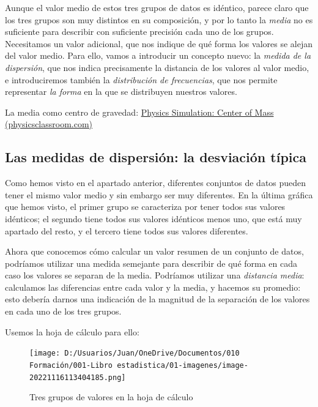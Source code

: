 \documentclass[
  letterpaper,
  DIV=11,
  numbers=noendperiod,
  oneside]{scrreprt}
\begin{document}
Aunque el valor medio de estos tres grupos de datos es idéntico, parece
claro que los tres grupos son muy distintos en su composición, y por lo
tanto la \emph{media} no es suficiente para describir con suficiente
precisión cada uno de los grupos. Necesitamos un valor adicional, que
nos indique de qué forma los valores se alejan del valor medio. Para
ello, vamos a introducir un concepto nuevo: la \emph{medida de la
dispersión}, que nos indica precisamente la distancia de los valores al
valor medio, e introduciremos también la \emph{distribución de
frecuencias}, que nos permite representar \emph{la forma} en la que se
distribuyen nuestros valores.

La media como centro de gravedad:
\href{https://www.physicsclassroom.com/Physics-Interactives/Balance-and-Rotation/COM-Builder/Center-Of-Mass-Interactive}{Physics
Simulation: Center of Mass (physicsclassroom.com)}

\hypertarget{las-medidas-de-dispersiuxf3n-la-desviaciuxf3n-tuxedpica}{%
\subsection{Las medidas de dispersión: la desviación
típica}\label{las-medidas-de-dispersiuxf3n-la-desviaciuxf3n-tuxedpica}}

Como hemos visto en el apartado anterior, diferentes conjuntos de datos
pueden tener el mismo valor medio y sin embargo ser muy diferentes. En
la última gráfica que hemos visto, el primer grupo se caracteriza por
tener todos sus valores idénticos; el segundo tiene todos sus valores
idénticos menos uno, que está muy apartado del resto, y el tercero tiene
todos sus valores diferentes.

Ahora que conocemos cómo calcular un valor resumen de un conjunto de
datos, podríamos utilizar una medida semejante para describir de qué
forma en cada caso los valores se separan de la media. Podríamos
utilizar una \emph{distancia media}: calculamos las diferencias entre
cada valor y la media, y hacemos su promedio: esto debería darnos una
indicación de la magnitud de la separación de los valores en cada uno de
los tres grupos.

Usemos la hoja de cálculo para ello:

\begin{figure}

{\centering \texttt{[image: D:/Usuarios/Juan/OneDrive/Documentos/010 Formación/001-Libro estadistica/01-imagenes/image-20221116113404185.png]}

}

\caption{Tres grupos de valores en la hoja de cálculo}

\end{figure}
\end{document}
